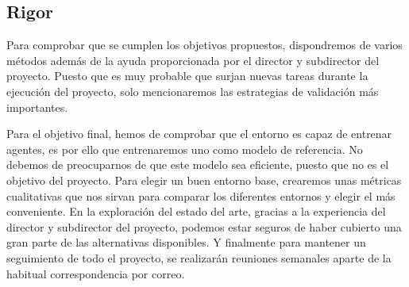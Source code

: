 \subsection{Rigor}
Para comprobar que se cumplen los objetivos propuestos, dispondremos de varios métodos además de la ayuda proporcionada por el director y subdirector del proyecto. Puesto que es muy probable que surjan nuevas tareas durante la ejecución del proyecto, solo mencionaremos las estrategias de validación más importantes. 

Para el objetivo final, hemos de comprobar que el entorno es capaz de entrenar agentes, es por ello que entrenaremos uno como modelo de referencia. No debemos de preocuparnos de que este modelo sea eficiente, puesto que no es el objetivo del proyecto. Para elegir un buen entorno base, crearemos unas métricas cualitativas que nos sirvan para comparar los diferentes entornos y elegir el más conveniente. En la exploración del estado del arte, gracias a la experiencia del director y subdirector del proyecto, podemos estar seguros de haber cubierto una gran parte de las alternativas disponibles. Y finalmente para mantener un seguimiento de todo el proyecto, se realizarán reuniones semanales aparte de la habitual correspondencia por correo.

 
 